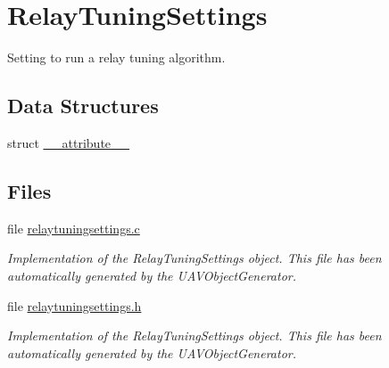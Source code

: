 \hypertarget{group___relay_tuning_settings}{\section{\-Relay\-Tuning\-Settings}
\label{group___relay_tuning_settings}
}


\-Setting to run a relay tuning algorithm.  


\subsection*{\-Data \-Structures}
\begin{DoxyCompactItemize}
\item 
struct \hyperlink{struct____attribute____}{\-\_\-\-\_\-attribute\-\_\-\-\_\-}
\end{DoxyCompactItemize}
\subsection*{\-Files}
\begin{DoxyCompactItemize}
\item 
file \hyperlink{relaytuningsettings_8c}{relaytuningsettings.\-c}
\begin{DoxyCompactList}\small\item\em \-Implementation of the \-Relay\-Tuning\-Settings object. \-This file has been automatically generated by the \-U\-A\-V\-Object\-Generator. \end{DoxyCompactList}\item 
file \hyperlink{relaytuningsettings_8h}{relaytuningsettings.\-h}
\begin{DoxyCompactList}\small\item\em \-Implementation of the \-Relay\-Tuning\-Settings object. \-This file has been automatically generated by the \-U\-A\-V\-Object\-Generator. \end{DoxyCompactList}\end{DoxyCompactItemize}
